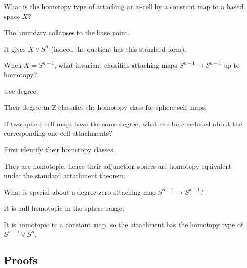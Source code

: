\begin{exercise}\label{exr:viii08-ped-02}
What is the homotopy type of attaching an $n$-cell by a constant map to a based space $X$?
\end{exercise}
\begin{hint}
The boundary collapses to the base point.
\end{hint}
\begin{solution}
It gives $X\vee S^n$ (indeed the quotient has this standard form).
\end{solution}

\begin{exercise}\label{exr:viii08-ped-03}
When $X=S^{n-1}$, what invariant classifies attaching maps $S^{n-1}\to S^{n-1}$ up to homotopy?
\end{exercise}
\begin{hint}
Use degree.
\end{hint}
\begin{solution}
Their degree in $\mathbb Z$ classifies the homotopy class for sphere self-maps.
\end{solution}

\begin{exercise}\label{exr:viii08-ped-04}
If two sphere self-maps have the same degree, what can be concluded about the corresponding one-cell attachments?
\end{exercise}
\begin{hint}
First identify their homotopy classes.
\end{hint}
\begin{solution}
They are homotopic, hence their adjunction spaces are homotopy equivalent under the standard attachment theorem.
\end{solution}

\begin{exercise}\label{exr:viii08-ped-05}
What is special about a degree-zero attaching map $S^{n-1}\to S^{n-1}$?
\end{exercise}
\begin{hint}
It is null-homotopic in the sphere range.
\end{hint}
\begin{solution}
It is homotopic to a constant map, so the attachment has the homotopy type of $S^{n-1}\vee S^n$.
\end{solution}

\subsection*{Proofs}

